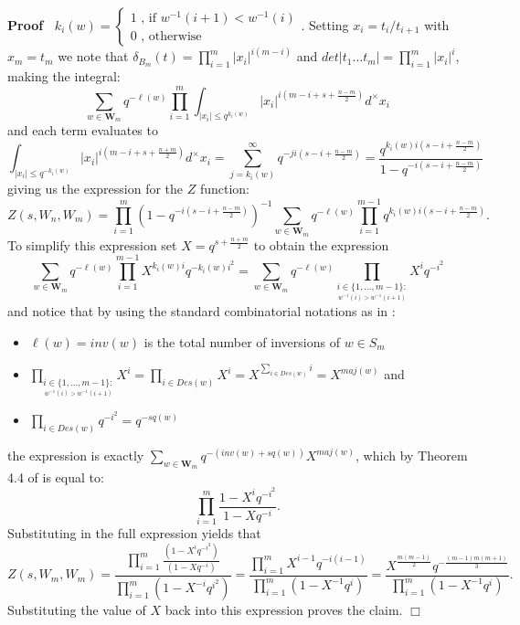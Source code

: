 \documentclass{article}
\newenvironment{proof}{\noindent\textbf{Proof\ }}{\hspace*{\fill}$\Box$\medskip}
\begin{document}
\begin{proof}
$k_i(w)=\begin{cases}
    1 \text{ , if } w^{-1}(i+1)<w^{-1}(i) \\
    0 \text{ , otherwise}
\end{cases}.$ Setting $x_i=t_i/t_{i+1}$ with $x_m=t_m$ we note that $\delta_{B_m}(t)=\prod\limits_{i=1}^m|x_i|^{i(m-i)}$ and $det|t_1\dots t_m|=\prod\limits_{i=1}^m|x_i|^i$, making the integral:
$$\sum\limits_{w\in\mathbf{W}_m}q^{-\ell(w)}\prod\limits_{i=1}^m\int_{|x_i|\leq q^{k_i(w)}}|x_i|^{i(m-i+s+\frac{n-m}{2})}d^{\times}x_i$$ and each term evaluates to $$\int_{|x_i|\leq q^{-k_i(w)}}|x_i|^{i(m-i+s+\frac{n+m}{2})}d^{\times}x_i=\sum\limits_{j=k_i(w)}^{\infty}q^{-ji(s-i+\frac{n-m}{2})}=\frac{q^{k_i(w)i(s-i+\frac{n-m}{2})}}{1-q^{-i(s-i+\frac{n-m}{2})}}$$ giving us the expression for the $Z$ function: 
$$Z(s,W_n,W_m)=\prod\limits_{i=1}^m(1-q^{-i(s-i+\frac{n-m}{2})})^{-1}\sum\limits_{w\in\mathbf{W}_m}q^{-\ell(w)}\prod\limits_{i=1}^{m-1}q^{k_i(w)i(s-i+\frac{n-m}{2})}.$$
To simplify this expression set $X=q^{s+\frac{n+m}{2}}$ to obtain the expression $$\sum\limits_{w\in\mathbf{W}_m}q^{-\ell(w)}\prod\limits_{i=1}^{m-1}X^{k_i(w)i}q^{-k_i(w)i^2}=\sum\limits_{w\in\mathbf{W}_m}q^{-\ell(w)}\prod\limits_{\underset{w^{-1}(i)>w^{-1}(i+1)}{i\in\{1,...,m-1\}:}}X^iq^{-i^2}$$ and notice that by using the standard combinatorial notations as in \cite{BrightSavage2010}:
\begin{itemize}
    \item $\ell(w)=inv(w)$ is the total number of inversions of $w\in S_m$
    \item $\prod\limits_{\underset{w^{-1}(i)>w^{-1}(i+1)}{i\in\{1,...,m-1\}:}}X^i=\prod\limits_{i\in Des(w)}X^i=X^{\sum\limits_{i\in Des(w)}i}=X^{maj(w)}$ and 
    \item $\prod_{i\in Des(w)}q^{-i^2}=q^{-sq(w)}$
\end{itemize}
the expression is exactly  $\sum\limits_{w\in\mathbf{W}_m}q^{-(inv(w)+sq(w))}X^{maj(w)}$, which by Theorem 4.4 of \cite{BrightSavage2010} is equal to:
$$\prod_{i=1}^m\frac{1-X^iq^{-i^2}}{1-Xq^{-i}}.$$
Substituting in the full expression yields that 
$$Z(s,W_m,W_m)=\frac{\prod_{i=1}^m\frac{(1-X^iq^{-i^2})}{(1-Xq^{-i})}}{\prod_{i=1}^m(1-X^{-i}q^{i^2})}=\frac{\prod\limits_{i=1}^mX^{i-1}q^{-i(i-1)}}{\prod\limits_{i=1}^m(1-X^{-1}q^i)}=\frac{X^{\frac{m(m-1)}{2}}q^{-\frac{(m-1)m(m+1)}{3}}}{\prod\limits_{i=1}^m(1-X^{-1}q^i)}.$$ Substituting the value of $X$ back into this expression proves the claim.
\end{proof}
\end{document}
